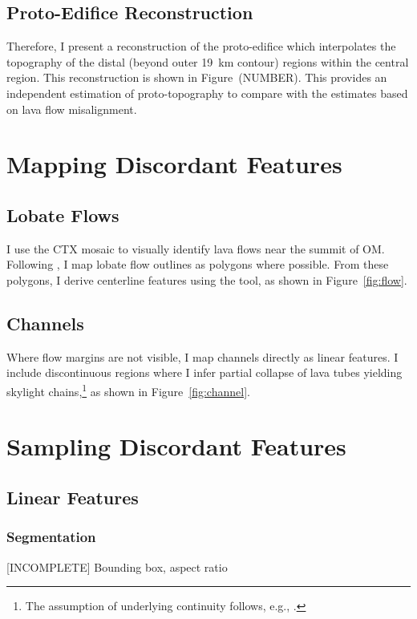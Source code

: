 \subsection{Proto-Edifice Reconstruction}
Therefore, I present a reconstruction of the proto-edifice which interpolates the topography of the distal (beyond outer \qty{19}{\km} contour) regions within the central region. This reconstruction is shown in Figure~(NUMBER). This provides an independent estimation of proto-topography to compare with the estimates based on lava flow misalignment.

\section{Mapping Discordant Features}\label{sec:mapping}

\subsection{Lobate Flows}
I use the \ac{CTX} mosaic to visually identify lava flows near the summit of \ac{OM}. Following \textcite{mouginis-mark_geologic_2021}, I map lobate flow outlines as polygons where possible. From these polygons, I derive centerline features using the  tool, as shown in Figure~\ref{fig:flow}.

\subsection{Channels}

Where flow margins are not visible, I map channels directly as linear features. I include discontinuous regions where I infer partial collapse of lava tubes yielding skylight chains,\footnote{The assumption of underlying continuity follows, e.g., \textcite{bleacher_olympus_2007,carr_geologic_2010,peters_lava_2021}.} as shown in Figure~\ref{fig:channel}.

\section{Sampling Discordant Features}

\subsection{Linear Features}

\subsubsection{Segmentation}
[INCOMPLETE] Bounding box, aspect ratio

